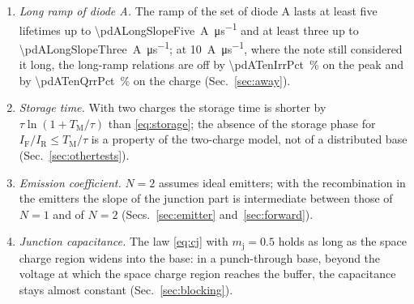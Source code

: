 \documentclass[10pt,a4paper]{scrartcl}
\newcommand{\IF}{I_\mathrm{F}}
\newcommand{\IR}{I_\mathrm{R}}
\newcommand{\TM}{T_\mathrm{M}}
\newcommand{\Nem}{N}                          %
\begin{document}
\begin{enumerate}
\item \emph{Long ramp of diode A.} The ramp of the set of diode A lasts at least five lifetimes up to \SI{\pdALongSlopeFive}{\ampere\per\micro\second} and at least three up to \SI{\pdALongSlopeThree}{\ampere\per\micro\second}; at \SI{10}{\ampere\per\micro\second}, where the note still considered it long, the long-ramp relations are off by \SI{\pdATenIrrPct}{\percent} on the peak and by \SI{\pdATenQrrPct}{\percent} on the charge (Sec.~\ref{sec:away}).
\item \emph{Storage time.} With two charges the storage time is shorter by $\tau\ln(1+\TM/\tau)$ than \eqref{eq:storage}; the absence of the storage phase for $\IF/\IR \leq \TM/\tau$ is a property of the two-charge model, not of a distributed base (Sec.~\ref{sec:othertests}).
\item \emph{Emission coefficient.} $\Nem = 2$ assumes ideal emitters; with the recombination in the emitters the slope of the junction part is intermediate between those of $\Nem = 1$ and of $\Nem = 2$ (Secs.~\ref{sec:emitter} and~\ref{sec:forward}).
\item \emph{Junction capacitance.} The law \eqref{eq:cj} with $m_\mathrm{j} = 0.5$ holds as long as the space charge region widens into the base: in a punch-through base, beyond the voltage at which the space charge region reaches the buffer, the capacitance stays almost constant (Sec.~\ref{sec:blocking}).
\end{enumerate}
\end{document}
